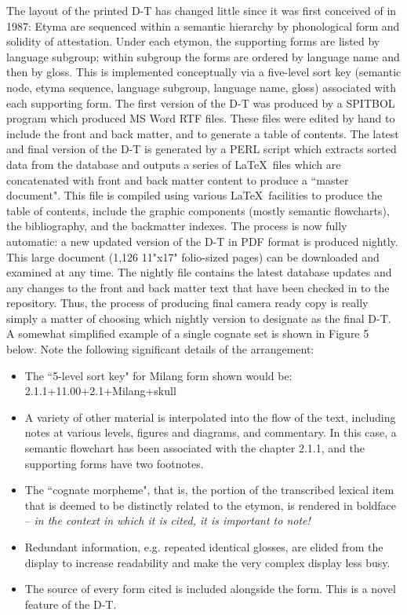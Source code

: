 The layout of the printed D-T has changed little since it was first conceived of in 1987: Etyma are sequenced within a semantic hierarchy by phonological form and solidity of attestation.  Under each etymon, the supporting forms are listed by language subgroup; within subgroup the forms are ordered by language name and then by gloss.  This is implemented conceptually via a five-level sort key (semantic node, etyma sequence, language subgroup, language name, gloss) associated with each supporting form.   The first version of the D-T was produced by a SPITBOL program which produced MS Word RTF files. These files were edited by hand to include the front and back matter, and to generate a table of contents. The latest and final version of the D-T is generated by a PERL script which extracts sorted data from the database and outputs a series of \LaTeX\  files which are concatenated with front and back matter content to produce a ``master document".  This file is compiled using various \LaTeX\  facilities to produce the table of contents, include the graphic components (mostly semantic flowcharts), the bibliography, and the backmatter indexes.  The process is now fully automatic: a new updated version of the D-T in PDF format is produced nightly. This large document (1,126 11"x17" folio-sized pages) can be downloaded and examined at any time.  The nightly file contains the latest database updates and any changes to the front and back matter text that have been checked in to the repository. Thus, the process of producing final camera ready copy is really simply a matter of choosing which nightly version to designate as the final D-T.
A somewhat simplified example of a single cognate set is shown in
Figure 5 below. Note the following significant details of the
arrangement:
\begin{itemize}
\item  The ``5-level sort key" for Milang form shown would be: 
2.1.1+11.00+2.1+Milang+skull
\item  A variety of other material is interpolated into the flow of the text, including notes at various levels, figures and diagrams, and commentary. In this case, a semantic flowchart has been associated with the chapter 2.1.1, and the supporting forms have two footnotes.
\item  The ``cognate morpheme", that is, the portion of the transcribed
  lexical item that is deemed to be distinctly related to the etymon,
  is rendered in boldface -- {\it in the context in which it is cited,
    it is important to note!}
\item  Redundant information, e.g. repeated identical glosses, are elided from the display to increase readability and make the very complex display less busy.
\item  The source of every form cited is included alongside the
form. This is a novel feature of the D-T.
\end{itemize}
